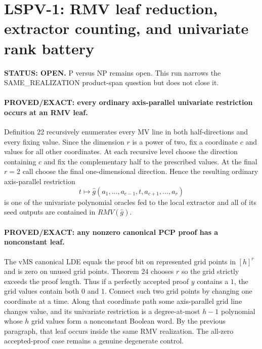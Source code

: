\documentclass[11pt]{article}
\begin{document}
\section*{LSPV-1: RMV leaf reduction, extractor counting, and univariate rank battery}

\textbf{STATUS: OPEN.} P versus NP remains open. This run narrows the SAME\_REALIZATION product-span question but does not close it.

\paragraph{PROVED/EXACT: every ordinary axis-parallel univariate restriction occurs at an RMV leaf.}
Definition 22 recursively enumerates every MV line in both half-directions and every fixing value. Since the dimension $r$ is a power of two, fix a coordinate $c$ and values for all other coordinates. At each recursive level choose the direction containing $c$ and fix the complementary half to the prescribed values. At the final $r=2$ call choose the final one-dimensional direction. Hence the resulting ordinary axis-parallel restriction
\[
t\longmapsto \widehat g(a_1,\ldots,a_{c-1},t,a_{c+1},\ldots,a_r)
\]
is one of the univariate polynomial oracles fed to the local extractor and all of its seed outputs are contained in $RMV(\widehat g)$.

\paragraph{PROVED/EXACT: any nonzero canonical PCP proof has a nonconstant leaf.}
The vMS canonical LDE equals the proof bit on represented grid points in $[h]^r$ and is zero on unused grid points. Theorem 24 chooses $r$ so the grid strictly exceeds the proof length. Thus if a perfectly accepted proof $y$ contains a $1$, the grid values contain both $0$ and $1$. Connect such two grid points by changing one coordinate at a time. Along that coordinate path some axis-parallel grid line changes value, and its univariate restriction is a degree-at-most $h-1$ polynomial whose $h$ grid values form a nonconstant Boolean word. By the previous paragraph, that leaf occurs inside the same RMV realization. The all-zero accepted-proof case remains a genuine degenerate control.
\end{document}
